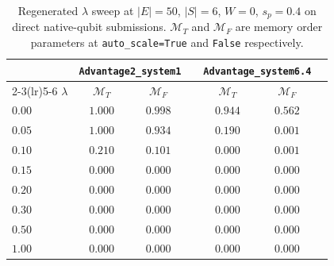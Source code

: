 \documentclass[aps,prapplied,reprint,superscriptaddress,floatfix,nofootinbib]{revtex4-2}
\begin{document}
\begin{table}[!htbp]
\centering
\caption{Regenerated $\lambda$ sweep at $|E|=50$, $|S|=6$, $W=0$, $s_p=0.4$ on direct native-qubit submissions.  $\mathcal{M}_T$ and $\mathcal{M}_F$ are memory order parameters at \texttt{auto\_scale=True} and \texttt{False} respectively.}
\label{tab:regen_lambda_native}
\small
\begin{tabular}{lcccccc}
\toprule
& \multicolumn{2}{c}{\texttt{Advantage2\_system1}} & & \multicolumn{2}{c}{\texttt{Advantage\_system6.4}} \\
\cmidrule(lr){2-3}\cmidrule(lr){5-6}
$\lambda$ & $\mathcal{M}_T$ & $\mathcal{M}_F$ & & $\mathcal{M}_T$ & $\mathcal{M}_F$ \\
\midrule
$0.00$ & $1.000$ & $0.998$ & & $0.944$ & $0.562$ \\
$0.05$ & $1.000$ & $0.934$ & & $0.190$ & $0.001$ \\
$0.10$ & $0.210$ & $0.101$ & & $0.000$ & $0.001$ \\
$0.15$ & $0.000$ & $0.000$ & & $0.000$ & $0.000$ \\
$0.20$ & $0.000$ & $0.000$ & & $0.000$ & $0.000$ \\
$0.30$ & $0.000$ & $0.000$ & & $0.000$ & $0.000$ \\
$0.50$ & $0.000$ & $0.000$ & & $0.000$ & $0.000$ \\
$1.00$ & $0.000$ & $0.000$ & & $0.000$ & $0.000$ \\
\bottomrule
\end{tabular}
\end{table}
\end{document}

